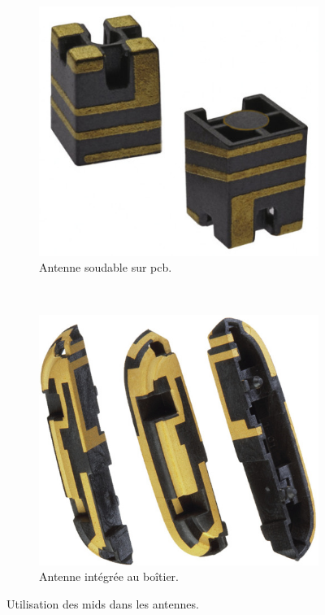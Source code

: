 \begin{figure}[h]
        \centering
        \begin{subfigure}[t]{0.4\textwidth}
                \includegraphics[width=\textwidth]{images/mid-antenna}
                \caption{Antenne soudable sur \gls{pcb}.}
        \end{subfigure}%
        ~ 
        \begin{subfigure}[t]{0.4\textwidth}
                \includegraphics[width=\textwidth]{images/lds-molex-antenna}
                \caption{Antenne intégrée au boîtier.}
        \end{subfigure}
        \caption{Utilisation des \glspl{mid} dans les antennes.}\label{fig:mid-ce-example}
\end{figure}

